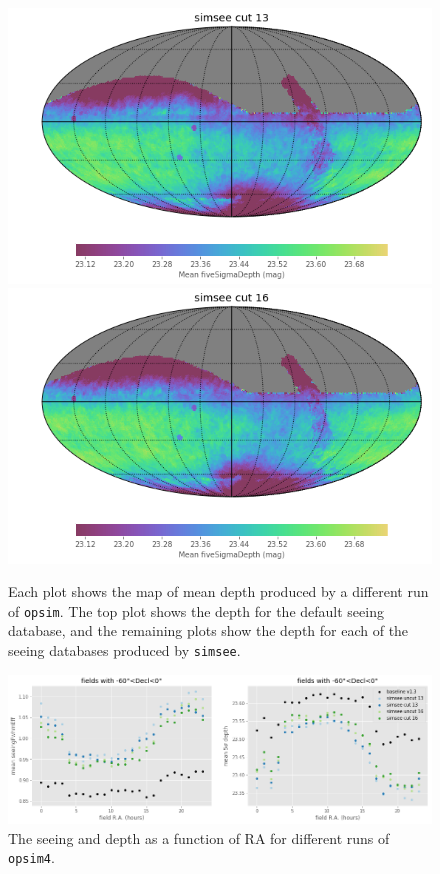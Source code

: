 \documentclass[DM,authoryear,toc]{lsstdoc}
\begin{document}
\begin{figure}
\endminipage\hfill
{}
  \includegraphics[width=\columnwidth]{./figures/depth_map_ss58779y13_v1_3_10yrs.png}
\endminipage\hfill
{}
  \includegraphics[width=\columnwidth]{./figures/depth_map_ss58779y16_v1_3_10yrs.png}
\endminipage\hfill
  \caption{Each plot shows the map of mean depth
    produced by a different run of \texttt{opsim}. The top plot
    shows the depth for the default seeing database, and the
    remaining plots show the depth for each of the seeing databases
    produced by \texttt{simsee}.} 
  \label{fig:simdepthmaps}
\end{figure}

\begin{figure}
  \includegraphics[width=\columnwidth]{./figures/seeing_depth_by_ra.png}
  \caption{The seeing and depth as a function of RA for different runs
  of \texttt{opsim4}.} 
  \label{fig:seelimra}
\end{figure}
\end{document}
